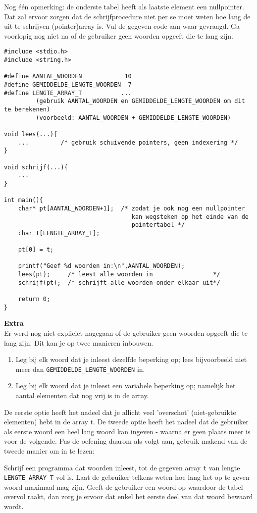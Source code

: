 Nog \'e\'en opmerking: de onderste tabel heeft als laatste element een nullpointer. 
Dat zal ervoor zorgen dat de schrijfprocedure niet per se moet weten hoe lang de uit te schrijven (pointer)array is.
Vul de gegeven code aan waar gevraagd. Ga voorlopig nog niet na of de gebruiker geen woorden opgeeft die te lang zijn.

\begin{verbatim}
#include <stdio.h>
#include <string.h>

#define AANTAL_WOORDEN            10 
#define GEMIDDELDE_LENGTE_WOORDEN  7
#define LENGTE_ARRAY_T           ... 
         (gebruik AANTAL_WOORDEN en GEMIDDELDE_LENGTE_WOORDEN om dit te berekenen) 
         (voorbeeld: AANTAL_WOORDEN + GEMIDDELDE_LENGTE_WOORDEN)

void lees(...){
    ...         /* gebruik schuivende pointers, geen indexering */
}

void schrijf(...){
    ...
}

int main(){
    char* pt[AANTAL_WOORDEN+1];  /* zodat je ook nog een nullpointer 
                                    kan wegsteken op het einde van de 
                                    pointertabel */
    char t[LENGTE_ARRAY_T];
	
    pt[0] = t;
	
    printf("Geef %d woorden in:\n",AANTAL_WOORDEN);
    lees(pt);     /* leest alle woorden in                 */
    schrijf(pt);  /* schrijft alle woorden onder elkaar uit*/
	
    return 0;
}
\end{verbatim}
{\bf Extra}
\\Er werd nog niet expliciet nagegaan of de gebruiker geen woorden opgeeft die te lang zijn. 
Dit kan je op twee manieren inbouwen.
\begin{enumerate}
\item Leg bij elk woord dat je inleest dezelfde beperking op; lees bijvoorbeeld niet meer dan \verb}GEMIDDELDE_LENGTE_WOORDEN} in.
\item Leg bij elk woord dat je inleest een variabele beperking op; namelijk het aantal elementen dat nog vrij is in de array.
\end{enumerate}
De eerste optie heeft het nadeel dat je allicht veel 'overschot' (niet-gebruikte elementen) hebt in de array t. De tweede optie heeft het nadeel
dat de gebruiker als eerste woord een heel lang woord kan ingeven - waarna er geen plaats meer is voor de volgende. Pas de oefening daarom als volgt aan, gebruik makend van de 
tweede manier om in te lezen:

Schrijf een programma dat woorden inleest, tot de gegeven array \verb}t} van lengte \verb}LENGTE_ARRAY_T} vol is. Laat de gebruiker telkens weten
hoe lang het op te geven woord maximaal mag zijn. Geeft de gebruiker een woord op waardoor de tabel overvol raakt, 
dan zorg je ervoor dat enkel het eerste deel van dat woord bewaard wordt.
\endoef
